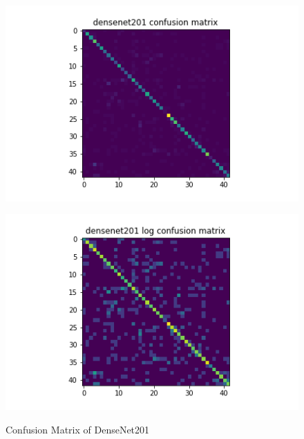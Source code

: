 \begin{figure}[H]
\begin{minipage}[b]{.5\linewidth}
    {\includegraphics[width=1.2\textwidth]{figs/conf_matrix/densenet201_conf.png}}
  \end{minipage}
  \hfill
  \begin{minipage}[b]{.5\linewidth}
    \centering

    {\includegraphics[width=1.2\textwidth]{figs/conf_matrix/densenet201_log_conf.png}}
  \end{minipage}


  \caption{Confusion Matrix of DenseNet201}
  \label{fig:densenet201_conf}
  \vspace{0.2in}
\end{figure}

